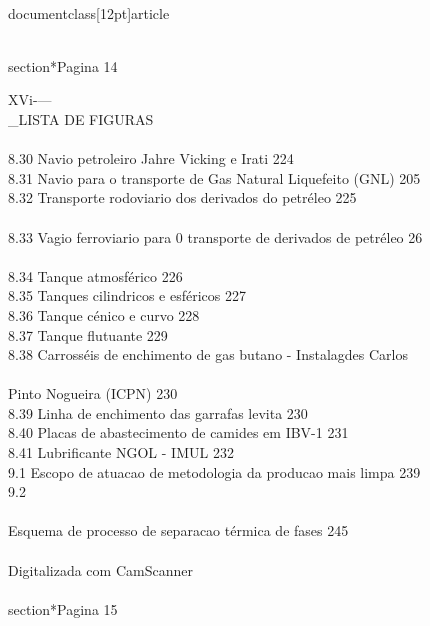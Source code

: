 \\documentclass[12pt]{article}
\begin{document}
\\section*{Pagina 14}

XVi-—\\_LISTA DE FIGURAS\\
\\
8.30 Navio petroleiro Jahre Vicking e Irati 224\\
8.31 Navio para o transporte de Gas Natural Liquefeito (GNL) 205\\
8.32 Transporte rodoviario dos derivados do petréleo 225\\
\\
8.33 Vagio ferroviario para 0 transporte de derivados de petréleo 26\\
\\
8.34 Tanque atmosférico 226\\
8.35 Tanques cilindricos e esféricos 227\\
8.36 Tanque cénico e curvo 228\\
8.37 Tanque flutuante 229\\
8.38 Carrosséis de enchimento de gas butano - Instalagdes Carlos\\
\\
Pinto Nogueira (ICPN) 230\\
8.39 Linha de enchimento das garrafas levita 230\\
8.40 Placas de abastecimento de camides em IBV-1 231\\
8.41 Lubrificante NGOL - IMUL 232\\
9.1 Escopo de atuacao de metodologia da producao mais limpa 239\\
9.2\\
\\
Esquema de processo de separacao térmica de fases 245\\
\\
Digitalizada com CamScanner\\

\\section*{Pagina 15}
\end{document}
